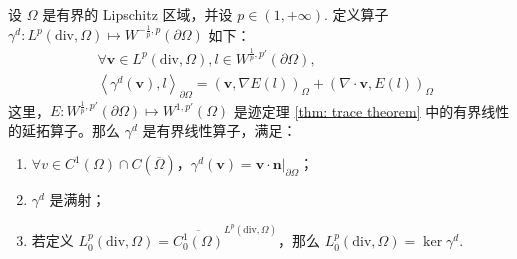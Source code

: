 \begin{theorem}\label{thm: nomal trace theorem}
	设 \(\Omega\) 是有界的 Lipschitz 区域，并设 \(p \in (1, +\infty)\). 定义算子 \(\gamma^{d}: L^{p}(\mathrm{div}, \Omega) \mapsto W^{-\frac{1}{p}, p}(\partial\Omega)\) 如下：
	\begin{equation}
		\begin{aligned}
			& \forall \bm v \in L^{p}(\mathrm{div}, \Omega), l \in W^{\frac{1}{p}, p'}(\partial\Omega), \quad \\
			& \left\langle \gamma^{d}(\bm v), l \right\rangle_{\partial\Omega} = \left(\bm v, \nabla E(l)\right)_{\Omega} + \left(\nabla\cdot\bm v, E(l)\right)_{\Omega}
		\end{aligned}
	\end{equation}
	这里，\(E: W^{\frac{1}{p}, p'}(\partial\Omega) \mapsto W^{1,p'}(\Omega)\) 是迹定理 \ref{thm: trace theorem} 中的有界线性的延拓算子。那么 \(\gamma^{d}\) 是有界线性算子，满足：
	\begin{enumerate}
		\item \(\forall v \in C^{1}(\Omega) \cap C(\overline{\Omega})\)，\(\gamma^{d}(\bm v) = \bm v \cdot \bm n \big|_{\partial\Omega}\)；
		\item \(\gamma^{d}\) 是满射；
		\item 若定义 \(L^{p}_{0}(\mathrm{div}, \Omega) = \overline{C_{0}^{1}(\Omega)}^{L^{p}(\mathrm{div}, \Omega)}\)，那么 \(L^{p}_{0}(\mathrm{div}, \Omega) = \ker \gamma^{d}\).
	\end{enumerate}
\end{theorem}



